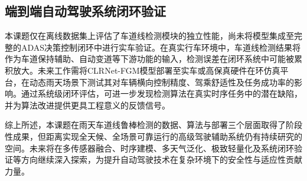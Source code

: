 \subsection{端到端自动驾驶系统闭环验证}

本课题仅在离线数据集上评估了车道线检测模块的独立性能，尚未将模型集成至完整的ADAS决策控制闭环中进行实车验证。在真实行车环境中，车道线检测结果将作为车道保持辅助、自动变道等下游功能的输入，检测误差在闭环系统中可能被累积放大。未来工作需将CLRNet-FGM模型部署至实车或高保真硬件在环仿真平台，在动态雨天场景下测试其对车辆横向控制精度、驾乘舒适性及任务成功率的影响。通过系统级闭环评估，可进一步发现检测算法在真实时序任务中的潜在缺陷，并为算法改进提供更具工程意义的反馈信号。

综上所述，本课题在雨天车道线鲁棒检测的数据、算法与部署三个层面取得了阶段性成果，但距离实现全天候、全场景可靠运行的高级驾驶辅助系统仍有持续研究的空间。未来将在多传感器融合、时序建模、多天气泛化、极致轻量化及系统闭环验证等方向继续深入探索，为提升自动驾驶技术在复杂环境下的安全性与适应性贡献力量。